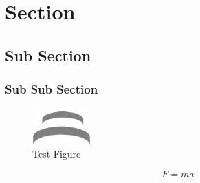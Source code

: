 \documentclass{design}
\begin{document}


\section{Section}

\subsection{Sub Section}

\subsubsection{Sub Sub Section}

\lipsum[1] \parencite{gopsill2020}

\begin{figure}[h]
    \centering
    \includegraphics[width=0.2\textwidth]{design-logo.png}
    \caption{Test Figure}
    \label{fig:my_label}
\end{figure}

\begin{equation}
    F = ma
\end{equation}

\printbibliography[]
\end{document}

